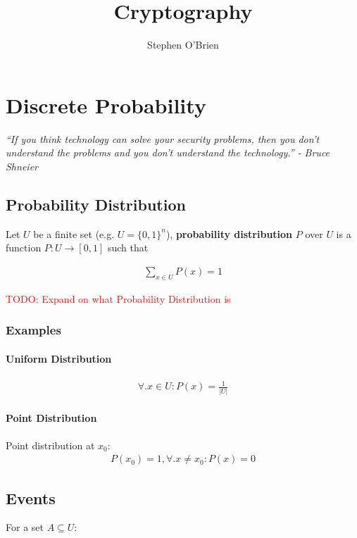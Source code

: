 \documentclass[11pt,a4paper]{report}
\title{Cryptography}
\author{Stephen O'Brien}
\newcommand\todo[1]{\noindent\textcolor{red}{TODO: #1}}
\begin{document}
\maketitle
\chapter{Discrete Probability}
\begin{center}
		\emph{
			``If you think technology can solve your security problems, then you don't understand the problems and you don't understand the technology.'' - Bruce Shneier
		}
\end{center}



\section{Probability Distribution}
Let $U$ be a finite set (e.g. $U = \{0,1\}^n$), \textbf{probability distribution} $P$ over $U$ is a function $P : U \rightarrow [0,1]$ such that

\begin{gather}
	\sum\limits_{x \in  U} P(x) = 1
\end{gather}

\todo{Expand on what Probability Distribution is}

\subsection{Examples}
\subsubsection{Uniform Distribution}
\begin{gather}
	\forall . x \in U : P(x) = \frac{1}{|U|}
\end{gather}
\subsubsection{Point Distribution}
Point distribution at $x_0$:
\begin{gather}
	P(x_0) = 1, \forall.x \neq x_0 : P(x) = 0
\end{gather}

	
	
\section{Events}
For a set $A \subseteq U$:
\end{document}
